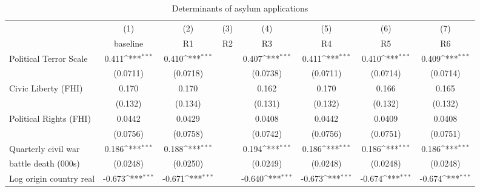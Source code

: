 \begin{table}[htbp]\centering
	\scriptsize
	\def\sym#1{\ifmmode^{#1}\else\(^{#1}\)\fi}
	\caption{Determinants of asylum applications}
	\begin{tabular}{l*{7}{c}}
		\hline\hline
		&\multicolumn{1}{c}{(1)}     &\multicolumn{1}{c}{(2)}       &\multicolumn{1}{c}{(3)}       &\multicolumn{1}{c}{(4)}    	&\multicolumn{1}{c}{(5)}  	&\multicolumn{1}{c}{(6)}   &\multicolumn{1}{c}{(7)} \\
		&\multicolumn{1}{c}{baseline}     &\multicolumn{1}{c}{R1}       &\multicolumn{1}{c}{R2}       &\multicolumn{1}{c}{R3}    	&\multicolumn{1}{c}{R4}  	&\multicolumn{1}{c}{R5}   &\multicolumn{1}{c}{R6}         	\\
\hline
Political Terror Scale&       0.411\sym{***}&       0.410\sym{***}&                     &       0.407\sym{***}&       0.411\sym{***}&       0.410\sym{***}&       0.409\sym{***}\\
                    &    (0.0711)         &    (0.0718)         &                     &    (0.0738)         &    (0.0711)         &    (0.0714)         &    (0.0714)         \\
[0.5em]
Civic Liberty (FHI) &       0.170         &       0.170         &                     &       0.162         &       0.170         &       0.166         &       0.165         \\
                    &     (0.132)         &     (0.134)         &                     &     (0.131)         &     (0.132)         &     (0.132)         &     (0.132)         \\
[0.5em]
Political Rights (FHI)&      0.0442         &      0.0429         &                     &      0.0408         &      0.0442         &      0.0409         &      0.0408         \\
                    &    (0.0756)         &    (0.0758)         &                     &    (0.0742)         &    (0.0756)         &    (0.0751)         &    (0.0751)         \\
[0.5em]
Quarterly civil war &       0.186\sym{***}&       0.188\sym{***}&                     &       0.194\sym{***}&       0.186\sym{***}&       0.186\sym{***}&       0.186\sym{***}\\
battle death (000s)                    &    (0.0248)         &    (0.0250)         &                     &    (0.0249)         &    (0.0248)         &    (0.0248)         &    (0.0248)         \\
[0.5em]
Log origin country real&      -0.673\sym{***}&      -0.671\sym{***}&                     &      -0.640\sym{***}&      -0.673\sym{***}&      -0.674\sym{***}&      -0.674\sym{***}\\

\end{tabular}
\end{table}
